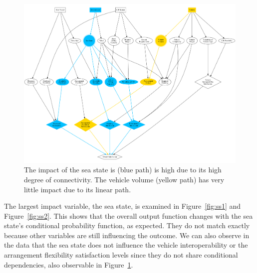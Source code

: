 \documentclass{svproc}
\begin{document}
\begin{figure}[!htb]
\begin{adjustwidth}{-0.5cm}{-.5cm} 
\centering
\includegraphics[width=13.2cm]{colored_tree.png}
\caption{The impact of the sea state is (blue path) is high due to its high degree of connectivity. The vehicle volume (yellow path) has very little impact due to its linear path.}
\label{fig:colored_tree}
\end{adjustwidth} 
\end{figure}

The largest impact variable, the sea state, is examined in Figure~\ref{fig:ss1} and Figure~\ref{fig:ss2}. This shows that the overall output function changes with the sea state's conditional probability function, as expected. They do not match exactly because other variables are still influencing the outcome. We can also observe in the data that the sea state does not influence the vehicle interoperability or the arrangement flexibility satisfaction levels since they do not share conditional dependencies, also observable in Figure~\ref{fig:colored_tree}. 
\end{document}
